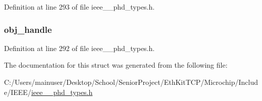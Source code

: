 Definition at line 293 of file ieee\+\_\+\_\+phd\+\_\+types.\+h.

\hypertarget{struct___handle_attr_val_map_entry_abbfff52b7a4956021522f5750c4b32c6}{}
\subsubsection[{obj\+\_\+handle}]{ obj\+\_\+handle}\label{struct___handle_attr_val_map_entry_abbfff52b7a4956021522f5750c4b32c6}


Definition at line 292 of file ieee\+\_\+\_\+phd\+\_\+types.\+h.



The documentation for this struct was generated from the following file\+:\begin{DoxyCompactItemize}
\item 
C\+:/\+Users/mainuser/\+Desktop/\+School/\+Senior\+Project/\+Eth\+Kit\+T\+C\+P/\+Microchip/\+Include/\+I\+E\+E\+E/\hyperlink{ieee__11073__phd__types_8h}{ieee\+\_\+\_\+phd\+\_\+types.\+h}\end{DoxyCompactItemize}
